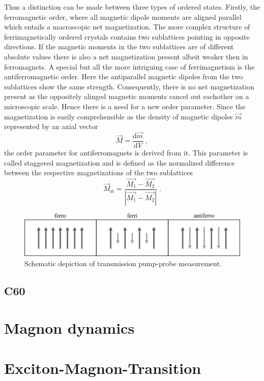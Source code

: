 Thus a distinction can be made between three types of ordered states.
Firstly, the ferromagnetic order, where all magnetic dipole moments are aligned parallel which entails a macroscopic net magnetization.
The more complex structure of ferrimagnetically ordered crystals contains two sublattices pointing in opposite directions.
If the magnetic moments in the two sublattices are of different absolute values there is also a net magnetization present albeit weaker then in ferromagnets.
A special but all the more intriguing case of ferrimagnetism is the antiferromagnetic order.
Here the antiparallel magnetic dipoles from the two sublattices show the same strength.
Consequently, there is no net magnetization present as the oppositely alinged magnetic moments cancel out eachother on a microscopic scale.
Hence there is a need for a new order parameter.
Since the magnetization is easily comprehensible as the density of magnetic dipoles $\vec{m}$ represented by an axial vector
\begin{equation}
    \vec{M} = \frac{\text{d}\vec{m}}{\text{d} V} \;,
\end{equation}
the order parameter for antiferromagnets is derived from it.
This parameter is called staggered magnetization and is defined as the normalized difference between the respective magnetizations of the two sublattices
\begin{equation}
    \vec{M}_{\text{st}} = \frac{\vec{M_1} - \vec{M_2}}{|\vec{M_1} - \vec{M_2}|} \;.
\end{equation}
\begin{figure}[ht]
    \centering
    \includegraphics[width=\textwidth]{pictures/magnetic_order.png}
    \caption{Schematic depiction of transmission pump-probe measurement.}
    \label{fig:pump_probe}
\end{figure}

\subsection{C60}

\section{Magnon dynamics}

\section{Exciton-Magnon-Transition}

